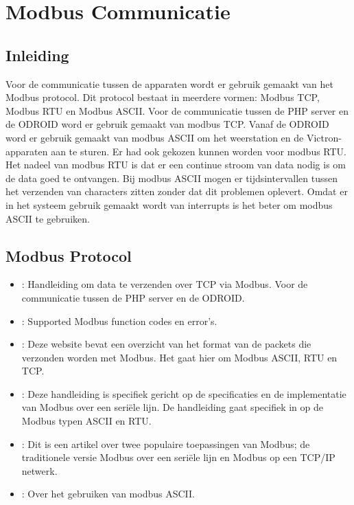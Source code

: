 \section{Modbus Communicatie}

\subsection{Inleiding}
Voor de communicatie tussen de apparaten wordt er gebruik gemaakt van het Modbus protocol. Dit protocol bestaat in meerdere vormen: Modbus TCP, Modbus RTU en Modbus ASCII. Voor de communicatie tussen de PHP server en de ODROID word er gebruik gemaakt van modbus TCP. Vanaf de ODROID word er gebruik gemaakt van modbus ASCII  om het weerstation en de Victron-apparaten aan te sturen. 
Er had ook gekozen kunnen worden voor modbus RTU. Het nadeel van modbus RTU is dat er een continue stroom van data nodig is om de data goed te ontvangen. Bij modbus ASCII mogen er tijdsintervallen tussen het verzenden van characters zitten zonder dat dit problemen oplevert. Omdat er in het systeem gebruik gemaakt wordt van interrupts is het beter om modbus ASCII te gebruiken.

\subsection{Modbus Protocol}
\begin{itemize}

\item \cite{ModTCP}: Handleiding om data te verzenden over TCP via Modbus. Voor de communicatie tussen de PHP server en de ODROID.

\item \cite{ModFAQ}: Supported Modbus function codes en error’s. 

\item \cite{modbus_types}: Deze website bevat een overzicht van het format van de packets die verzonden worden met Modbus. Het gaat hier om Modbus ASCII, RTU en TCP.

\item \cite{modbus_protocol_3}: Deze handleiding is specifiek gericht op de specificaties en de implementatie van Modbus over een seri\"ele lijn. De handleiding gaat specifiek in op de Modbus typen ASCII en RTU.

\item \cite{modbus_protocol_4}: Dit is een artikel over twee populaire toepassingen van Modbus; de traditionele versie Modbus over een seri\"ele lijn en Modbus op een TCP/IP netwerk.

\item \cite{ModProto}: Over het gebruiken van modbus ASCII.

\end{itemize}

